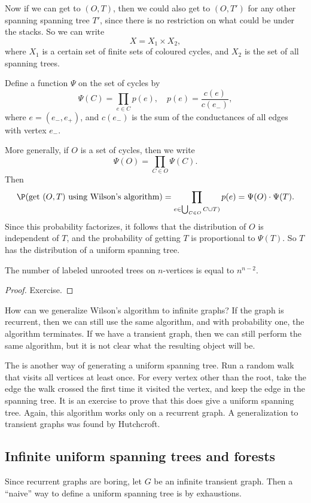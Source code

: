 \documentclass[a4paper]{article}
\begin{document}
Now if we can get to $(O, T)$, then we could also get to $(O, T')$ for any other spanning spanning tree $T'$, since there is no restriction on what could be under the stacks. So we can write
\[
  X = X_1 \times X_2,
\]
where $X_1$ is a certain set of finite sets of coloured cycles, and $X_2$ is the set of all spanning trees.

Define a function $\Psi$ on the set of cycles by
\[
  \Psi(C) = \prod_{e \in C} p(e),\quad p(e) = \frac{c(e)}{c(e_-)},
\]
where $e = (e_-, e_+)$, and $c(e_-)$ is the sum of the conductances of all edges with vertex $e_-$.

More generally, if $O$ is a set of cycles, then we write
\[
  \Psi(O) = \prod_{C \in O} \Psi(C).
\]
Then
\[
  \P(\text{get $(O, T)$ using Wilson's algorithm}) = \prod_{e \in \bigcup_{C \in O} C \cup T)} p(e) = \Psi(O) \cdot \Psi(T).
\]
Since this probability factorizes, it follows that the distribution of $O$ is independent of $T$, and the probability of getting $T$ is proportional to $\Psi(T)$. So $T$ has the distribution of a uniform spanning tree.

\begin{cor}
  The number of labeled unrooted trees on $n$-vertices is equal to $n^{n - 2}$.
\end{cor}

\begin{proof}
  Exercise.
\end{proof}

How can we generalize Wilson's algorithm to infinite graphs? If the graph is recurrent, then we can still use the same algorithm, and with probability one, the algorithm terminates. If we have a transient graph, then we can still perform the same algorithm, but it is not clear what the resulting object will be.

The  is another way of generating a uniform spanning tree. Run a random walk that visits all vertices at least once. For every vertex other than the root, take the edge the walk crossed the first time it visited the vertex, and keep the edge in the spanning tree. It is an exercise to prove that this does give a uniform spanning tree. Again, this algorithm works only on a recurrent graph. A generalization to transient graphs was found by Hutchcroft.

\subsection{Infinite uniform spanning trees and forests}
Since recurrent graphs are boring, let $G$ be an infinite transient graph. Then a ``naive'' way to define a uniform spanning tree is by exhaustions.
\end{document}
